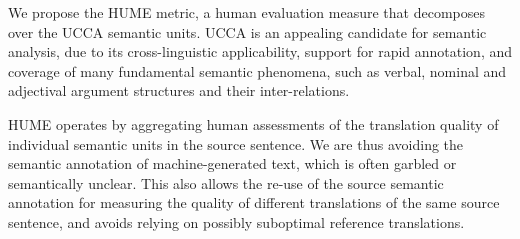 \documentclass[11pt,letterpaper]{article}
\newcommand{\secref}[1]{\S\ref{#1}}
\newcommand{\XXX}[1]{{\color{red}XXX #1}} %
\newcommand{\bh}[1]{\footnote{\color{blue}BH: #1}}
\def\parcite#1{\cite{#1}}
\begin{document}

We propose the HUME metric,
a human evaluation measure that decomposes over the UCCA semantic units.
UCCA \parcite{abend2013universal} is an appealing candidate for semantic analysis,
due to its cross-linguistic applicability, support for rapid annotation, and coverage
of many fundamental semantic phenomena, such as verbal, nominal and adjectival
argument structures and their inter-relations.

HUME operates by aggregating human assessments of the translation quality of individual
semantic units in the source sentence. We 
are thus avoiding the semantic annotation of machine-generated text,
which is often garbled or semantically unclear.
This also allows the re-use of the source semantic annotation for
measuring the quality of different translations of the same source sentence,
and 
avoids relying on possibly suboptimal reference translations.


% 
\end{document}
